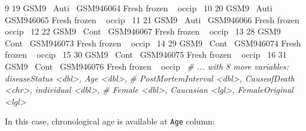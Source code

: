 \documentclass[]{article}
\newcommand{\hlnum}[1]{\textcolor[rgb]{0.816,0.125,0.439}{#1}}%
\newcommand{\hlstr}[1]{\textcolor[rgb]{0.251,0.627,0.251}{#1}}%
\newcommand{\hlcom}[1]{\textcolor[rgb]{0.502,0.502,0.502}{\textit{#1}}}%
\newcommand{\hlopt}[1]{\textcolor[rgb]{0,0,0}{#1}}%
\newcommand{\hlstd}[1]{\textcolor[rgb]{0.251,0.251,0.251}{#1}}%
\newcommand{\hlkwd}[1]{\textcolor[rgb]{0.878,0.439,0.125}{#1}}%
\newenvironment{Shaded}{\begin{myshaded}}{\end{myshaded}}
\newcommand{\KeywordTok}[1]{\hlkwd{#1}}
\newcommand{\DecValTok}[1]{\hlnum{#1}}
\newcommand{\StringTok}[1]{\hlstr{#1}}
\newcommand{\CommentTok}[1]{\hlcom{#1}}
\newcommand{\OperatorTok}[1]{\hlopt{#1}}
\newcommand{\NormalTok}[1]{\hlstd{#1}}
\begin{document}
\begin{Shaded}
\begin{Highlighting}[]
\StringTok{   }\DecValTok{9}            \DecValTok{19}\NormalTok{ GSM9}\OperatorTok{~}\StringTok{ }\NormalTok{Auti}\OperatorTok{~}\StringTok{ }\NormalTok{GSM946064     Fresh frozen }\OperatorTok{~}\StringTok{ }\NormalTok{occip}\OperatorTok{~}
\StringTok{  }\DecValTok{10}            \DecValTok{20}\NormalTok{ GSM9}\OperatorTok{~}\StringTok{ }\NormalTok{Auti}\OperatorTok{~}\StringTok{ }\NormalTok{GSM946065     Fresh frozen }\OperatorTok{~}\StringTok{ }\NormalTok{occip}\OperatorTok{~}
\StringTok{  }\DecValTok{11}            \DecValTok{21}\NormalTok{ GSM9}\OperatorTok{~}\StringTok{ }\NormalTok{Auti}\OperatorTok{~}\StringTok{ }\NormalTok{GSM946066     Fresh frozen }\OperatorTok{~}\StringTok{ }\NormalTok{occip}\OperatorTok{~}
\StringTok{  }\DecValTok{12}            \DecValTok{22}\NormalTok{ GSM9}\OperatorTok{~}\StringTok{ }\NormalTok{Cont}\OperatorTok{~}\StringTok{ }\NormalTok{GSM946067     Fresh frozen }\OperatorTok{~}\StringTok{ }\NormalTok{occip}\OperatorTok{~}
\StringTok{  }\DecValTok{13}            \DecValTok{28}\NormalTok{ GSM9}\OperatorTok{~}\StringTok{ }\NormalTok{Cont}\OperatorTok{~}\StringTok{ }\NormalTok{GSM946073     Fresh frozen }\OperatorTok{~}\StringTok{ }\NormalTok{occip}\OperatorTok{~}
\StringTok{  }\DecValTok{14}            \DecValTok{29}\NormalTok{ GSM9}\OperatorTok{~}\StringTok{ }\NormalTok{Cont}\OperatorTok{~}\StringTok{ }\NormalTok{GSM946074     Fresh frozen }\OperatorTok{~}\StringTok{ }\NormalTok{occip}\OperatorTok{~}
\StringTok{  }\DecValTok{15}            \DecValTok{30}\NormalTok{ GSM9}\OperatorTok{~}\StringTok{ }\NormalTok{Cont}\OperatorTok{~}\StringTok{ }\NormalTok{GSM946075     Fresh frozen }\OperatorTok{~}\StringTok{ }\NormalTok{occip}\OperatorTok{~}
\StringTok{  }\DecValTok{16}            \DecValTok{31}\NormalTok{ GSM9}\OperatorTok{~}\StringTok{ }\NormalTok{Cont}\OperatorTok{~}\StringTok{ }\NormalTok{GSM946076     Fresh frozen }\OperatorTok{~}\StringTok{ }\NormalTok{occip}\OperatorTok{~}
\StringTok{  }\CommentTok{# ... with 8 more variables: diseaseStatus <dbl>, Age <dbl>,}
\StringTok{  }\CommentTok{#   PostMortemInterval <dbl>, CauseofDeath <chr>, individual <dbl>,}
\StringTok{  }\CommentTok{#   Female <dbl>, Caucasian <lgl>, FemaleOriginal <lgl>}
\end{Highlighting}
\end{Shaded}

In this case, chronological age is available at \texttt{Age} column:

\begin{Shaded}
\end{Shaded}
\end{document}
